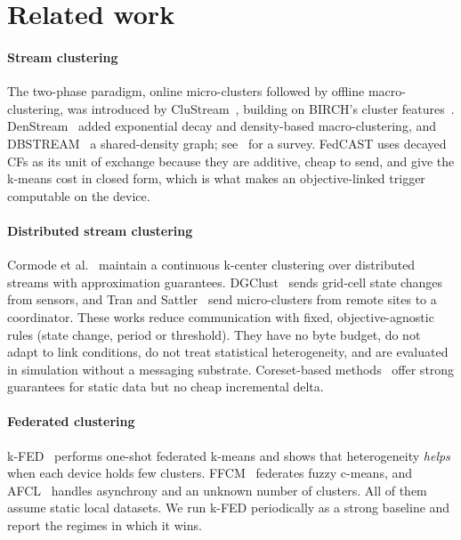 \section{Related work}\label{sec:related}

\paragraph{Stream clustering} The two-phase paradigm, online micro-clusters followed by offline macro-clustering, was introduced by CluStream~\cite{aggarwal2003clustream}, building on BIRCH's cluster features~\cite{zhang1996birch}. DenStream~\cite{cao2006denstream} added exponential decay and density-based macro-clustering, and DBSTREAM~\cite{hahsler2016dbstream} a shared-density graph; see~\cite{zubaroglu2021review} for a survey. FedCAST uses decayed CFs as its unit of exchange because they are additive, cheap to send, and give the k-means cost in closed form, which is what makes an objective-linked trigger computable on the device.

\paragraph{Distributed stream clustering} Cormode et al.~\cite{cormode2007divide} maintain a continuous k-center clustering over distributed streams with approximation guarantees. DGClust~\cite{gama2011dgclust} sends grid-cell state changes from sensors, and Tran and Sattler~\cite{tran2013communication} send micro-clusters from remote sites to a coordinator. These works reduce communication with fixed, objective-agnostic rules (state change, period or threshold). They have no byte budget, do not adapt to link conditions, do not treat statistical heterogeneity, and are evaluated in simulation without a messaging substrate. Coreset-based methods~\cite{balcan2013distributed} offer strong guarantees for static data but no cheap incremental delta.

\paragraph{Federated clustering} k-FED~\cite{dennis2021kfed} performs one-shot federated k-means and shows that heterogeneity \emph{helps} when each device holds few clusters. FFCM~\cite{stallmann2022ffcm} federates fuzzy c-means, and AFCL~\cite{zhang2025afcl} handles asynchrony and an unknown number of clusters. All of them assume static local datasets. We run k-FED periodically as a strong baseline and report the regimes in which it wins.

